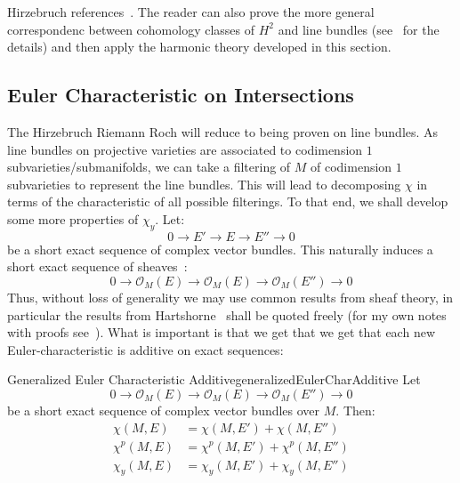 \documentclass{ut-thesis}
\newenvironment{Proof}[1][]
  {\begin{ProofTcb}[#1]}
  {\end{ProofTcb}}
\newcommand{\CO}{{\mathcal{O}}}
\begin{document}
\begin{Proof}
  Hirzebruch references~\cite[p.127, Thm~15.9.1]{hirzebruchTopologicalMethodsAlgebraic1995}. The reader can
  also prove the more general correspondenc between cohomology classes of $H^2$ and line bundles
  (see~\cite{NateKTheory} for the details) and then apply the harmonic theory developed in this section.
\end{Proof}

\subsection{Euler Characteristic on Intersections}\label{sec:propGenerlizedEulerChar}

The Hirzebruch Riemann Roch will reduce to being proven on line bundles. As line bundles on projective
varieties are associated to codimension $1$ subvarieties/submanifolds, we can take a filtering of $M$ of codimension $1$
subvarieties to represent the line bundles. This will lead to decomposing $\chi$ in terms of the characteristic
of all possible filterings. To that end, we shall develop some more properties of $\chi_y$. Let:
\[
  0 \to E' \to E \to E'' \to 0
\]
be a short exact sequence of complex vector bundles. This naturally induces a short exact sequence of
sheaves~\cite{NateAlgGeo}:
\[
  0 \to \CO_M(E) \to \CO_M(E) \to \CO_M({E''}) \to 0
\]
Thus, without loss of generality we may use common results from sheaf theory, in particular the results from
Hartshorne~\cite{hartshorneAlgebraicGeometry2013} shall be quoted freely (for my own notes with proofs
see~\cite{NateAlgGeo}). What is important is that we get that we get that each new Euler-characteristic is
additive on exact sequences:

\begin{thm}{Generalized Euler Characteristic Additive}{generalizedEulerCharAdditive}
  Let
\[
  0 \to \CO_M(E) \to \CO_M(E) \to \CO_M({E''}) \to 0
\]
  be a short exact sequence of complex vector bundles over $M$. Then:
  \begin{align*}
   \chi(M, E) &= \chi(M, E') + \chi(M, E'')\\
   \chi^p(M, E) &= \chi^p(M, E') + \chi^p(M, E'')\\
   \chi_y(M, E) &= \chi_y(M, E') + \chi_y(M, E'')
  \end{align*}
\end{thm}
\end{document}
